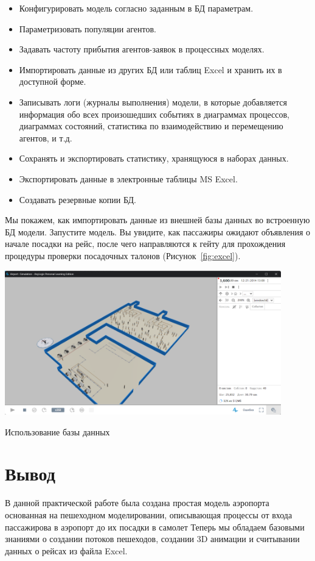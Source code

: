 \begin{itemize}
	\item Конфигурировать модель согласно заданным в БД параметрам.
	\item Параметризовать популяции агентов.
	\item Задавать частоту прибытия агентов-заявок в процессных моделях.
	\item Импортировать данные из других БД или таблиц Excel и хранить их в
		доступной форме.
	\item Записывать логи (журналы выполнения) модели, в которые добавляется
		информация обо всех произошедших событиях в диаграммах
		процессов, диаграммах состояний, статистика по взаимодействию и
		перемещению агентов, и т.д.
	\item Сохранять и экспортировать статистику, хранящуюся в наборах данных.
	\item Экспортировать данные в электронные таблицы MS Excel.
	\item Создавать резервные копии БД.
\end{itemize}

Мы покажем, как импортировать данные из внешней базы данных во
встроенную БД модели.
Запустите модель. Вы увидите, как пассажиры ожидают объявления о
начале посадки на рейс, после чего направляются к гейту для прохождения
процедуры проверки посадочных талонов (Рисунок~\ref{fig:excel}).

\begin{image}
	\includegraphics[width=0.9\textwidth]{2023-04-11}
	\caption{Использование базы данных}
	\label{fig:excel}
\end{image}

\clearpage

\section*{\LARGE Вывод}
В данной практической работе была создана простая модель аэропорта
основанная на пешеходном моделировании, описывающая процессы
от входа пассажирова в аэропорт до их посадки в самолет
Теперь мы обладаем базовыми знаниями о создании потоков
пешеходов, создании 3D анимации и считывании данных о рейсах из файла Excel.


